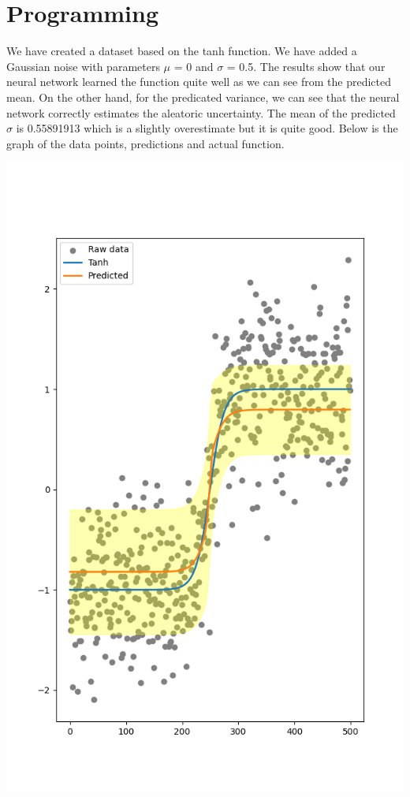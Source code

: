 \documentclass[11pt]{article}
\begin{document}
\section{Programming}
\label{sec:orgbfcde54}
We have created a dataset based on the tanh function. We have added a
Gaussian noise with parameters \(\mu\) = 0 and \(\sigma\) = 0.5. The results
show that our neural network learned the function quite well as we
can see from the predicted mean. On the other hand, for the predicated
variance, we can see that the neural network correctly estimates the
aleatoric uncertainty. The mean of the predicted \(\sigma\) is 0.55891913
which is a slightly overestimate but it is quite good.
Below is the graph of the data points, predictions and actual function.
\begin{center}
\includegraphics[width=.9\linewidth]{./tanh.png}
\end{center}
\end{document}
